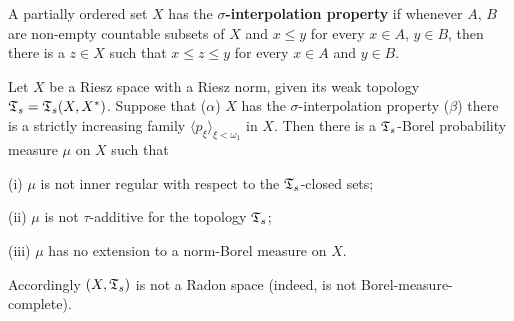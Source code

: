  A partially ordered set $X$ has the
{\bf $\sigma$-interpolation property} if whenever $A$, $B$ are non-empty countable subsets of $X$ and
$x\le y$ for every $x\in A$, $y\in B$, then there is a $z\in X$ such
that $x\le z\le y$ for every $x\in A$ and $y\in B$.   

 Let $X$
be a Riesz space with a Riesz norm, given its
weak topology $\frak T_s=\frak T_s(X,X^*)$.   Suppose that ($\alpha$)
$X$ has the $\sigma$-interpolation property ($\beta$) there is a
strictly increasing
family $\langle p_{\xi}\rangle_{\xi<\omega_1}$ in $X$.   Then there is a
$\frak T_s$-Borel probability measure $\mu$ on $X$ such that

(i) $\mu$ is not inner regular with respect to the $\frak T_s$-closed
sets;

(ii) $\mu$ is not $\tau$-additive for the topology $\frak T_s$;

(iii) $\mu$ has no extension to a norm-Borel measure on $X$.

\noindent Accordingly $(X,\frak T_s)$ is not a Radon space (indeed, is
not Borel-measure-complete).

